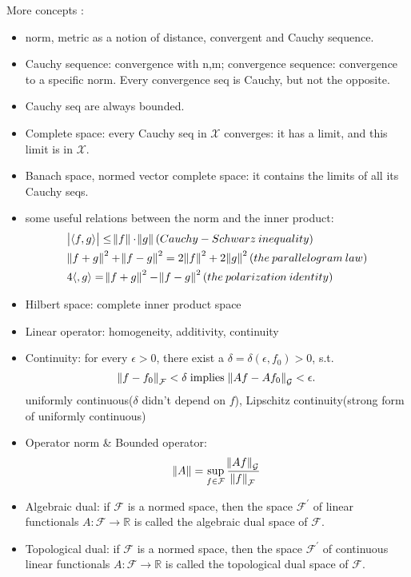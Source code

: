 \documentclass[12pt, letterpaper]{article}
\begin{document}
More concepts \cite{RKHS_notes}:
\begin{itemize}
	\item norm, metric as a notion of distance, convergent and Cauchy sequence.
	\item Cauchy sequence: convergence with n,m; convergence sequence: convergence to a specific norm. Every convergence seq is Cauchy, but not the opposite.
	\item Cauchy seq are always bounded.
	\item Complete space: every Cauchy seq in $\mathcal{X}$ converges: it has a limit, and this limit is in $\mathcal{X}$.
	\item Banach space, normed vector complete space: it contains the limits of all its Cauchy seqs.
	\item some useful relations between the norm and the inner product:
	\begin{align}
		& \abs{\langle f,g \rangle} \leq \norm{f} \cdot \norm{g} (Cauchy-Schwarz \: inequality) \\
		& \norm{f+g}^2 + \norm{f-g}^2 = 2 \norm{f}^2 + 2 \norm{g}^2 (the \: parallelogram \: law) \\
		& 4 \langle , g \rangle = \norm{f+g}^2 - \norm{f-g}^2 (the \: polarization \: identity)
	\end{align}
	\item Hilbert space: complete inner product space
	\item Linear operator: homogeneity, additivity, continuity
	\item Continuity: for every $\epsilon > 0$, there exist a $\delta = \delta(\epsilon, f_0) > 0$, s.t. 
	\begin{equation}
		\norm{f - f_0}_{\mathcal{F}} < \delta \; \textrm{implies} \; \norm{Af - Af_0}_{\mathcal{G}} < \epsilon.
	\end{equation}
	uniformly continuous($\delta$ didn't depend on $f$), Lipschitz continuity(strong form of uniformly continuous)
	\item Operator norm \& Bounded operator:
	\begin{equation}
		\norm{A} = \sup_{f \in \mathcal{F}} \frac{\norm{Af}_{\mathcal{G}}}{\norm{f}_{\mathcal{F}}}
	\end{equation}
	\item Algebraic dual: if $\mathcal{F}$ is a normed space, then the space $\mathcal{F}^{\prime}$ of linear functionals $A : \mathcal{F} \rightarrow \mathbb{R}$ is called the algebraic dual space of $\mathcal{F}$.
	\item Topological dual: if $\mathcal{F}$ is a normed space, then the space $\mathcal{F}^{\prime}$ of continuous linear functionals $A : \mathcal{F} \rightarrow \mathbb{R}$ is called the topological dual space of $\mathcal{F}$.

\end{itemize}
\end{document}
